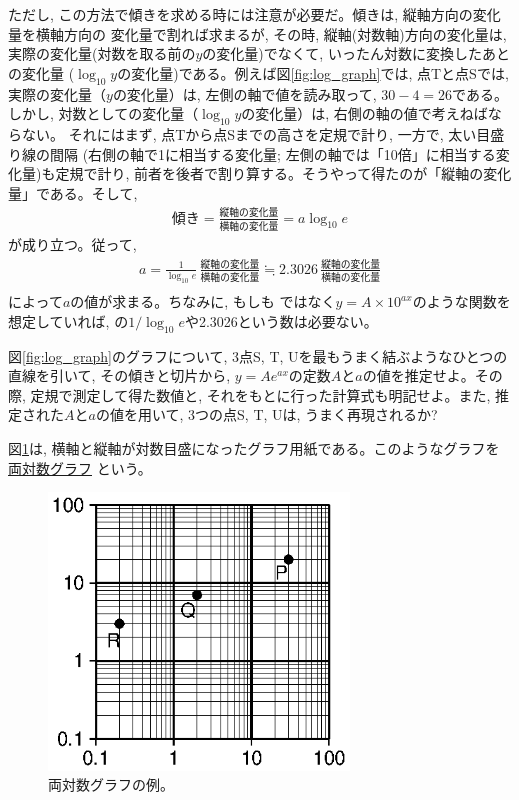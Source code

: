 ただし, この方法で傾きを求める時には注意が必要だ。傾きは, 縦軸方向の変化量を横軸方向の
変化量で割れば求まるが, その時, 縦軸(対数軸)方向の変化量は, 
実際の変化量(対数を取る前の$y$の変化量)でなくて, いったん対数に変換したあとの変化量
($\log_{10} y$の変化量)である。例えば図\ref{fig:log_graph}では, 点Tと点Sでは,  
実際の変化量（$y$の変化量）は, 左側の軸で値を読み取って, $30-4=26$である。しかし,  
対数としての変化量（$\log_{10}y$の変化量）は, 右側の軸の値で考えねばならない。
それにはまず, 点Tから点Sまでの高さを定規で計り, 一方で, 太い目盛り線の間隔
(右側の軸で1に相当する変化量; 左側の軸では「10倍」に相当する変化量)も定規で計り, 
前者を後者で割り算する。そうやって得たのが「縦軸の変化量」である。そして, 
\begin{eqnarray}
\text{傾き}=\frac{\text{縦軸の変化量}}{\text{横軸の変化量}}=a\log_{10} e
\end{eqnarray}
が成り立つ。従って, 
\begin{eqnarray}
a=\frac{1}{\log_{10} e}\,\frac{\text{縦軸の変化量}}{\text{横軸の変化量}}
\fallingdotseq2.3026\,\frac{\text{縦軸の変化量}}{\text{横軸の変化量}}\nonumber\\
\label{eq:logplot_a05}
\end{eqnarray}
によって$a$の値が求まる。ちなみに, もしも
ではなく$y=A\times10^{ax}$のような関数を想定していれば, 
の$1/\log_{10}e$や2.3026という数は必要ない。\mv

\begin{q}\label{q:exp_loglingraph1} 図\ref{fig:log_graph}のグラフについて, 
3点S, T, Uを最もうまく結ぶようなひとつの直線を引いて, 
その傾きと切片から, $y=Ae^{ax}$の定数$A$と$a$の値を推定せよ。その際, 
定規で測定して得た数値と, それをもとに行った計算式も明記せよ。また, 
推定された$A$と$a$の値を用いて, 3つの点S, T, Uは, うまく再現されるか? \end{q}\mv

図\ref{fig:log_log_graph}は, 横軸と縦軸が対数目盛になったグラフ用紙である。このようなグラフを\underline{両対数グラフ}
という。

\begin{figure}[h]
    \centering
    \includegraphics[width=8cm]{log_log_paper.eps}
    \caption{両対数グラフの例。\label{fig:log_log_graph}}  
\end{figure}

